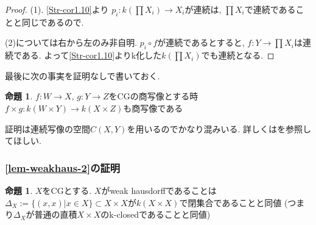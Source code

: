 \documentclass[dvipdfmx,a4paper,11pt]{article}
\theoremstyle{definition}
\newtheorem{prop}[thm]{命題}
\begin{document}
\begin{proof}
(1). \ref{Str-cor1.10}より
$p_i : k(\prod X_i) \to X_i$が連続は, $\prod X_i$で連続であることと同じであるので.

(2)については右から左のみ非自明. 
$p_i \circ f $が連続であるとすると, $f : Y \to \prod X_i $は連続である.
よって\ref{Str-cor1.10}よりk化した$k(\prod X_i)$でも連続となる. 
\end{proof}



最後に次の事実を証明なしで書いておく.

 \begin{tcolorbox}
 [colback = white, colframe = green!35!black, fonttitle = \bfseries,breakable = true]
\begin{prop}\cite[Prop 2.20]{Str}
\label{Str-prop2.20}
$f : W \to X$, $g : Y \to Z$をCGの商写像とする時
$f \times g :k( W \times Y) \to k(X \times Z)$も商写像である
\end{prop}
\end{tcolorbox}
証明は連続写像の空間$C(X,Y)$を用いるのでかなり混みいる. 
詳しくは\cite{Str}を参照してほしい. 


\subsubsection{\ref{lem-weakhaus-2}の証明}
\label{subsubsec-CGWH-colim}

 \begin{tcolorbox}
 [colback = white, colframe = green!35!black, fonttitle = \bfseries,breakable = true]
\begin{prop}\cite[Prop2.14]{Str}
\label{Str-prop2.14}
$X$をCGとする.
$X$がweak hausdorffであることは
$\Delta_X := \{ (x,x)| x \in X\}\subset X \times X$が$k(X \times X)$で閉集合であることと同値
(つまり$\Delta_X$が普通の直積$X \times X$のk-closedであることと同値)
\end{prop}
\end{tcolorbox}
\end{document}
